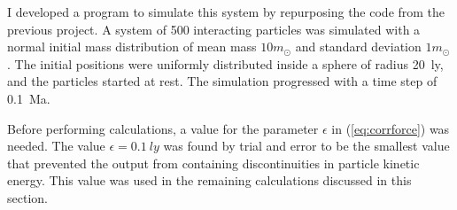 \documentclass[aps,prc,reprint,floatfix,nobalancelastpage]{revtex4-1}
\newcommand{\sun}[0]{\ensuremath{\odot}}
\begin{document}
    I developed a program to simulate this system by repurposing the code from the previous project. \cite{Bradt2016} A system of 500 interacting particles was simulated with a normal initial mass distribution of mean mass $10 m_\sun$ and standard deviation $1 m_\sun$. The initial positions were uniformly distributed inside a sphere of radius \SI{20}{ly}, and the particles started at rest. The simulation progressed with a time step of \SI{0.1}{Ma}.

    Before performing calculations, a value for the parameter $\epsilon$ in (\ref{eq:corrforce}) was needed. The value $\epsilon = \SI{0.1}{ly}$ was found by trial and error to be the smallest value that prevented the output from containing discontinuities in particle kinetic energy. This value was used in the remaining calculations discussed in this section.
\end{document}

